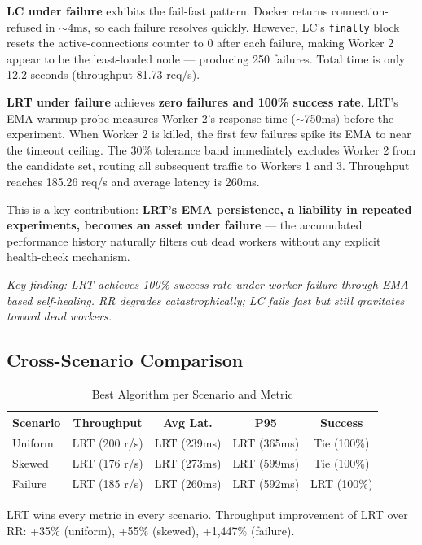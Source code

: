 \documentclass[conference]{IEEEtran}
\begin{document}
\textbf{LC under failure} exhibits the fail-fast pattern. Docker returns connection-refused in $\sim$4ms, so each failure resolves quickly. However, LC's \texttt{finally} block resets the active-connections counter to 0 after each failure, making Worker 2 appear to be the least-loaded node --- producing 250 failures. Total time is only 12.2 seconds (throughput 81.73 req/s).

\textbf{LRT under failure} achieves \textbf{zero failures and 100\% success rate}. LRT's EMA warmup probe measures Worker 2's response time ($\sim$750ms) before the experiment. When Worker 2 is killed, the first few failures spike its EMA to near the timeout ceiling. The 30\% tolerance band immediately excludes Worker 2 from the candidate set, routing all subsequent traffic to Workers 1 and 3. Throughput reaches 185.26 req/s and average latency is 260ms.

This is a key contribution: \textbf{LRT's EMA persistence, a liability in repeated experiments, becomes an asset under failure} --- the accumulated performance history naturally filters out dead workers without any explicit health-check mechanism.

\textit{Key finding: LRT achieves 100\% success rate under worker failure through EMA-based self-healing. RR degrades catastrophically; LC fails fast but still gravitates toward dead workers.}

\subsection{Cross-Scenario Comparison}

\begin{table}[h]
  \centering
  \caption{Best Algorithm per Scenario and Metric}
  \begin{tabular}{lcccc}
    \toprule
    \textbf{Scenario} & \textbf{Throughput} & \textbf{Avg Lat.} & \textbf{P95} & \textbf{Success} \\
    \midrule
    Uniform  & LRT (200 r/s)  & LRT (239ms) & LRT (365ms) & Tie (100\%) \\
    Skewed   & LRT (176 r/s)  & LRT (273ms) & LRT (599ms) & Tie (100\%) \\
    Failure  & LRT (185 r/s)  & LRT (260ms) & LRT (592ms) & LRT (100\%) \\
    \bottomrule
  \end{tabular}
\end{table}

LRT wins every metric in every scenario. Throughput improvement of LRT over RR: +35\% (uniform), +55\% (skewed), +1,447\% (failure).
\end{document}
